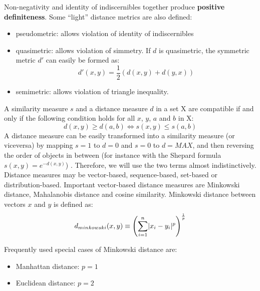 Non-negativity and identity of indiscernibles together produce \textbf{positive definiteness}.
Some ``light'' distance metrics are also defined:
\begin{itemize}
\item pseudometric: allows violation of identity of indiscernibles
\item quasimetric: allows violation of simmetry. If $d$ is quasimetric, the symmetric metric $d'$ can easily be formed as:
\begin{equation}
d'(x,y) = \frac{1}{2}(d(x,y) + d(y,x))
\end{equation}
\item semimetric: allows violation of triangle inequality.
\end{itemize}
A similarity measure $s$ and a distance measure $d$ in a set X are compatible if and only if the following condition holds for all $x$, $y$, $a$ and $b$ in X:
\begin{equation}
d(x,y) \geq d(a,b) \Leftrightarrow s(x,y) \leq s(a,b)
\end{equation}
A distance measure can be easily transformed into a similarity measure (or viceversa) by mapping $s=1$ to $d=0$ and $s=0$ to $d=MAX$, and then reversing the order of objects in between (for instance with the Shepard formula $s(x,y) = e^{-d(x,y)}$) \cite{stober11}. Therefore, we will use the two terms almost indistinctively.\\
Distance measures may be vector-based, sequence-based, set-based or distribution-based. Important vector-based distance measures are Minkowski distance, Mahalanobis distance and cosine similarity. Minkowski distance between vectors $x$ and $y$ is defined as:
\begin{equation}
d_{minkowski}(x,y) \equiv \left( \sum\limits_{i=1}^{n} \lvert x_i - y_i\rvert^p \right)^{\frac{1}{p}}
\end{equation}

Frequently used special cases of Minkowski distance are:
\begin{itemize}
\item Manhattan distance: $p=1$
\item Euclidean distance: $p=2$
\end{itemize}


